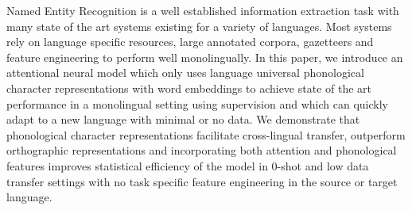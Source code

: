 Named Entity Recognition is a well established information extraction task with many state of the art systems existing for a variety of languages. Most systems rely on language specific resources, large annotated corpora, gazetteers and feature engineering to perform well monolingually. In this paper, we introduce an attentional neural model which only uses language universal phonological character representations with word embeddings to achieve state of the art performance in a monolingual setting using supervision and which can quickly adapt to a new language with minimal or no data. We demonstrate that phonological character representations facilitate cross-lingual transfer, outperform orthographic representations and incorporating both attention and phonological features improves statistical efficiency of the model in 0-shot and low data transfer settings with no task specific feature engineering in the source or target language.
